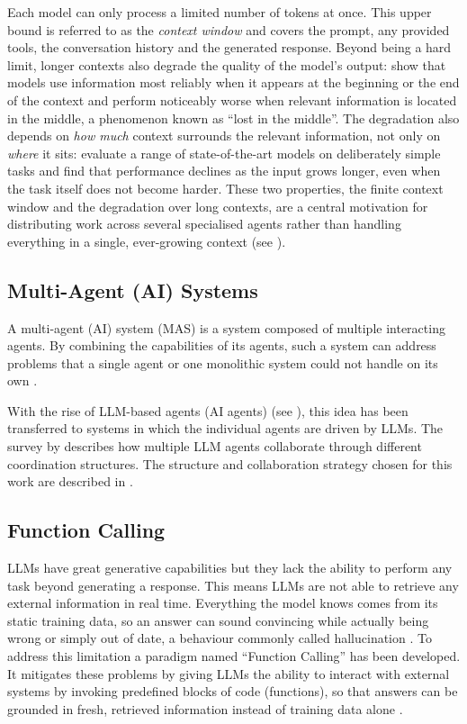 Each model can only process a limited number of tokens at once. This upper bound is referred to as the
\emph{context window} and covers the prompt, any provided tools, the conversation history and the generated
response. Beyond being a hard limit, longer contexts also degrade the quality of the model's output:
\textcite{liu-etal-2024-lost} show that models use information most reliably when it appears at the beginning or the
end of the context and perform noticeably worse when relevant information is located in the middle, a
phenomenon known as \enquote{lost in the middle}. The degradation also depends on \emph{how much} context
surrounds the relevant information, not only on \emph{where} it sits: \textcite{hong2025context} evaluate a
range of state-of-the-art models on deliberately simple tasks and find that performance declines as the input grows longer, even when the task itself does not become harder. These two properties, the finite context window and the
degradation over long contexts, are a central motivation for distributing work across several specialised
agents rather than handling everything in a single, ever-growing context (see ).


\subsection{Multi-Agent (AI) Systems}
\label{sec:multi-agent}
A multi-agent (AI) system (MAS) is a system composed of multiple interacting agents.
By combining the capabilities of its agents, such a system can address problems that a single agent or one monolithic system could not handle on its own \parencite{tran2025multiagentcollaborationmechanismssurvey}.

With the rise of LLM-based agents (AI agents) (see ), this idea has been transferred to systems in which
the individual agents are driven by LLMs. The survey by \textcite{tran2025multiagentcollaborationmechanismssurvey} describes how
multiple LLM agents collaborate through different coordination structures. The structure and
collaboration strategy chosen for this work are described in .




\subsection{Function Calling}
\label{sec:func-calling}
LLMs have great generative capabilities but they lack the ability to perform any task beyond generating a response.
This means LLMs are not able to retrieve any external information in real time.
Everything the model knows comes from its static training data, so an answer can sound convincing
while actually being wrong or simply out of date, a behaviour commonly called hallucination \parencite{Qu_2025}.
To address this limitation a paradigm named \enquote{Function Calling} has been developed.
It mitigates these problems by giving LLMs the ability to interact with external systems by invoking predefined blocks of code (functions), so that answers can be grounded in fresh, retrieved information instead of training data alone \parencite{wang2026FunctionCalling}.

